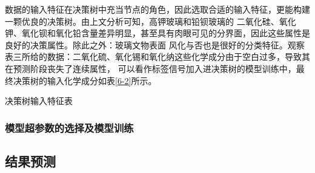 \documentclass[withoutpreface,bwprint]{cumcmthesis} %
\begin{document}
数据的输入特征在决策树中充当节点的角色，因此选取合适的输入特征，更能构建一颗优良的决策树。由上文分析可知，高钾玻璃和铅钡玻璃的 二氧化硅、氧化钾、氧化钡和氧化铅含量差异明显，甚至具有肉眼可见的分界面，因此这些属性是良好的决策属性。除此之外：玻璃文物表面 风化与否也是很好的分类特征。观察表三所给的数据：二氧化硫、氧化锡和氧化纳这些化学成分由于空白过多，导致其在预测阶段丧失了连续属性， 可以看作标签信号加入进决策树的模型训练中，最终决策树的输入化学成分如表\ref{6-2}所示。

\begin{table}[!h]
	\centering
	\caption{决策树输入特征表}
	\label{6-2}
\end{table}

\subsubsection{模型超参数的选择及模型训练}

\subsection{结果预测}
\end{document}
